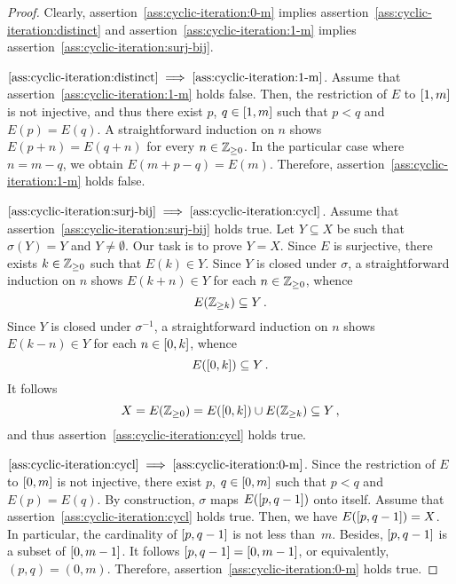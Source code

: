 \begin{proof}
  Clearly,
  assertion~\ref{ass:cyclic-iteration:0-m} implies assertion~\ref{ass:cyclic-iteration:distinct}
  and 
  assertion~\ref{ass:cyclic-iteration:1-m} implies assertion~\ref{ass:cyclic-iteration:surj-bij}.
  
  $\ref{ass:cyclic-iteration:distinct} \implies \ref{ass:cyclic-iteration:1-m}$.
  Assume that  assertion~\ref{ass:cyclic-iteration:1-m} holds false.
  Then, the restriction of $E$ to $\left[ 1, m \right]$ is not injective,
  and thus there exist $p$, $q \in \left[ 1, m \right]$ such that $p < q$ and $E(p) = E(q)$.
  A straightforward induction on $n$ shows $E(p + n) = E(q + n)$ for every $n \in \mathbb{Z}_{\ge 0}$.
  In the particular case where $n = m - q$,
  we obtain $E(m + p - q) = E(m)$.
  Therefore, assertion~\ref{ass:cyclic-iteration:1-m} holds false.

  $\ref{ass:cyclic-iteration:surj-bij} \implies \ref{ass:cyclic-iteration:cycl}$.
  Assume that assertion~\ref{ass:cyclic-iteration:surj-bij} holds true.
  Let $Y \subseteq X$ be such that $\sigma(Y) = Y$ and $Y \ne \emptyset$.
  Our task is to prove $Y = X$. 
  Since $E$ is surjective, there exists $k \in \mathbb{Z}_{\ge 0}$ such that $E(k) \in Y$.
  Since $Y$ is closed under $\sigma$,
  a straightforward induction on $n$ shows $E{(k + n)} \in Y$ for each $n \in \mathbb{Z}_{\ge 0}$,
  whence
  $$
  E(\mathbb{Z}_{\ge k}) \subseteq Y \, .
  $$
  Since $Y$ is closed under $\sigma^{-1}$, 
  a straightforward induction on $n$ shows $E{(k - n)} \in Y$ for each $n \in \left[ 0, k \right]$,
  whence
  $$
  E(\left[ 0, k \right]) \subseteq Y \, .
  $$
  It follows
  $$
  X = E(\mathbb{Z}_{\ge 0}) = E(\left[ 0, k \right]) \cup E(\mathbb{Z}_{\ge k}) \subseteq Y \,, 
  $$
  and thus assertion~\ref{ass:cyclic-iteration:cycl} holds true.

  $\ref{ass:cyclic-iteration:cycl} \implies \ref{ass:cyclic-iteration:0-m}$.
  Since the restriction of $E$ to $\left[ 0, m \right]$ is not injective,
  there exist $p$, $q \in \left[ 0, m \right]$ such that $p < q$ and $E(p) = E(q)$.
  By construction, $\sigma$ maps $E(\left[ p, q - 1 \right])$ onto itself.
  Assume that assertion~\ref{ass:cyclic-iteration:cycl} holds true.
  Then, we have $E(\left[ p, q - 1 \right]) = X$.
  In particular, the cardinality of $\left[ p, q - 1 \right]$ is not less than~$m$.
  Besides, $\left[ p, q - 1 \right]$ is a subset of $\left[ 0, m - 1 \right]$.
  It follows $\left[ p, q - 1 \right] = \left[ 0, m - 1 \right]$, or equivalently, $(p, q) = (0, m)$.
  Therefore, assertion~\ref{ass:cyclic-iteration:0-m} holds true. 
\end{proof}

